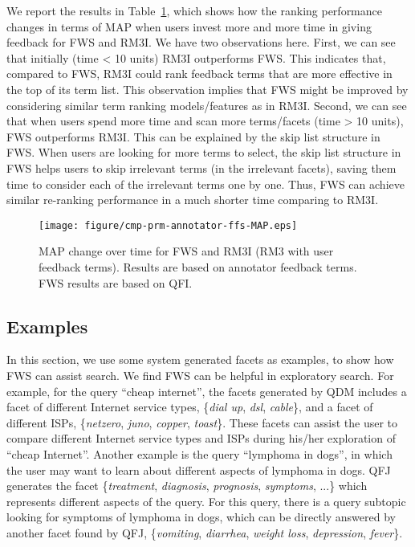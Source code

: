 We report the results in Table~\ref{fig:ex-rm3i}, which shows how the ranking performance changes in terms of MAP when users invest more and more time in giving feedback for FWS and RM3I. We have two observations here. First, we can see that initially (time < 10 units) RM3I outperforms FWS. This indicates that, compared to FWS, RM3I could rank feedback terms that are more effective in the top of its term list. This observation implies that FWS might be improved by considering similar term ranking models/features as in RM3I. Second, we can see that when users spend more time and scan more terms/facets (time > 10 units), FWS outperforms RM3I. This can be explained by the skip list structure in FWS. When users are looking for more terms to select, the skip list structure in FWS helps users to skip irrelevant terms (in the irrelevant facets), saving them time to consider each of the irrelevant terms one by one. Thus, FWS can achieve similar re-ranking performance in a much shorter time comparing to RM3I.
 
\begin{figure}[H]
\centering
\texttt{[image: figure/cmp-prm-annotator-ffs-MAP.eps]}
\caption{MAP change over time for FWS and RM3I (RM3 with user feedback terms). Results are based on annotator feedback terms. FWS results are based on QFI.}
\label{fig:ex-rm3i}
\end{figure}

\subsection{Examples}
In this section, we use some system generated facets as examples, to show how FWS can assist search. We find FWS can be helpful in exploratory search. 
For example, for the query ``cheap internet'', the facets generated by QDM includes a facet of different Internet service types, \{\textit{dial up}, \textit{dsl}, \textit{cable}\}, and a facet of different ISPs, \{\textit{netzero}, \textit{juno}, \textit{copper}, \textit{toast}\}. These facets can assist the user to compare different Internet service types and ISPs during his/her exploration of ``cheap Internet''. Another example is the query ``lymphoma in dogs'', in which the user may want to learn about different aspects of lymphoma in dogs. QFJ generates the facet \{\textit{treatment}, \textit{diagnosis}, \textit{prognosis}, \textit{symptoms}, ...\} which represents different aspects of the query. For this query, there is a query subtopic looking for symptoms of lymphoma in dogs, which can be directly answered by another facet found by QFJ, \{\textit{vomiting}, \textit{diarrhea}, \textit{weight loss}, \textit{depression}, \textit{fever}\}. 


